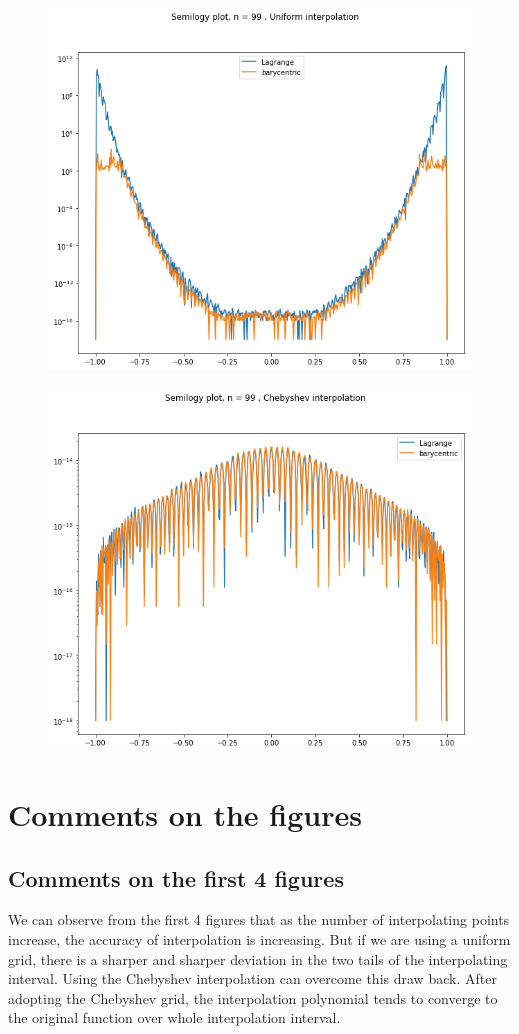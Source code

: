 \documentclass[a4paper]{article}
\begin{document}
\begin{figure}[!ht]
\includegraphics[scale=0.5]{99&U.png}
\end{figure}
\begin{figure}[!ht]
\includegraphics[scale=0.5]{99&C.png}
\end{figure}
\section{Comments on the figures}
\subsection{Comments on the first 4 figures}
We can observe from the first 4 figures that as the number of interpolating points increase, the accuracy of interpolation is increasing. But if we are using a uniform grid, there is a sharper and sharper deviation in the two tails of the interpolating interval. Using the Chebyshev interpolation can overcome this draw back. After adopting the Chebyshev grid, the interpolation polynomial tends to converge to the original function over whole interpolation interval.
\end{document}
